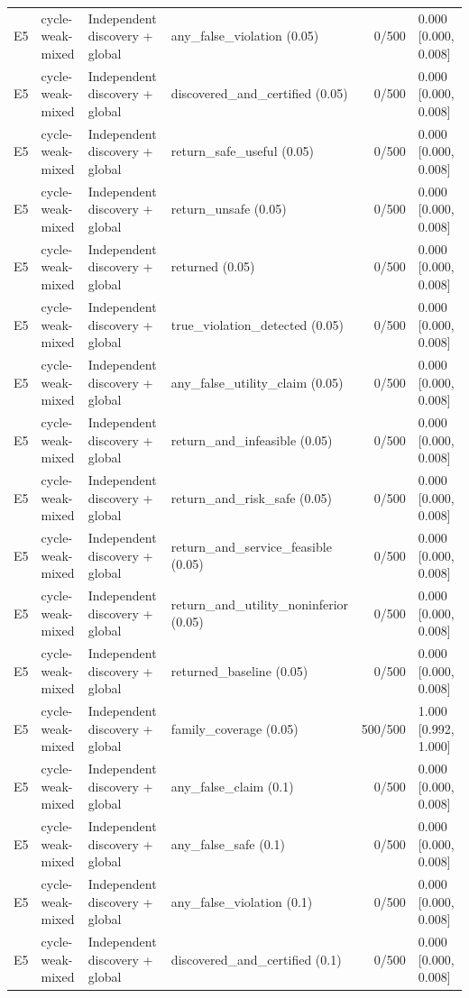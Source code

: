 \begin{longtable}{p{.04\linewidth}p{.18\linewidth}p{.19\linewidth}p{.16\linewidth}r p{.21\linewidth}}
E5 & cycle-weak-mixed & Independent discovery + global & any\_false\_violation (0.05) & 0/500 & 0.000 [0.000, 0.008]\\
E5 & cycle-weak-mixed & Independent discovery + global & discovered\_and\_certified (0.05) & 0/500 & 0.000 [0.000, 0.008]\\
E5 & cycle-weak-mixed & Independent discovery + global & return\_safe\_useful (0.05) & 0/500 & 0.000 [0.000, 0.008]\\
E5 & cycle-weak-mixed & Independent discovery + global & return\_unsafe (0.05) & 0/500 & 0.000 [0.000, 0.008]\\
E5 & cycle-weak-mixed & Independent discovery + global & returned (0.05) & 0/500 & 0.000 [0.000, 0.008]\\
E5 & cycle-weak-mixed & Independent discovery + global & true\_violation\_detected (0.05) & 0/500 & 0.000 [0.000, 0.008]\\
E5 & cycle-weak-mixed & Independent discovery + global & any\_false\_utility\_claim (0.05) & 0/500 & 0.000 [0.000, 0.008]\\
E5 & cycle-weak-mixed & Independent discovery + global & return\_and\_infeasible (0.05) & 0/500 & 0.000 [0.000, 0.008]\\
E5 & cycle-weak-mixed & Independent discovery + global & return\_and\_risk\_safe (0.05) & 0/500 & 0.000 [0.000, 0.008]\\
E5 & cycle-weak-mixed & Independent discovery + global & return\_and\_service\_feasible (0.05) & 0/500 & 0.000 [0.000, 0.008]\\
E5 & cycle-weak-mixed & Independent discovery + global & return\_and\_utility\_noninferior (0.05) & 0/500 & 0.000 [0.000, 0.008]\\
E5 & cycle-weak-mixed & Independent discovery + global & returned\_baseline (0.05) & 0/500 & 0.000 [0.000, 0.008]\\
E5 & cycle-weak-mixed & Independent discovery + global & family\_coverage (0.05) & 500/500 & 1.000 [0.992, 1.000]\\
E5 & cycle-weak-mixed & Independent discovery + global & any\_false\_claim (0.1) & 0/500 & 0.000 [0.000, 0.008]\\
E5 & cycle-weak-mixed & Independent discovery + global & any\_false\_safe (0.1) & 0/500 & 0.000 [0.000, 0.008]\\
E5 & cycle-weak-mixed & Independent discovery + global & any\_false\_violation (0.1) & 0/500 & 0.000 [0.000, 0.008]\\
E5 & cycle-weak-mixed & Independent discovery + global & discovered\_and\_certified (0.1) & 0/500 & 0.000 [0.000, 0.008]\\

\end{longtable}
